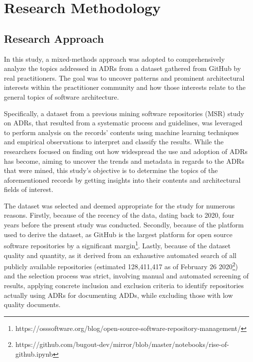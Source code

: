 \chapter{Research Methodology}
    \section{Research Approach}
        In this study, a mixed-methods approach was adopted to comprehensively analyze the topics addressed in ADRs from a dataset gathered from GitHub by real practitioners. The goal was to uncover patterns and prominent architectural interests within the practitioner community and how those interests relate to the general topics of software architecture. 

        Specifically, a dataset from a previous mining software repositories (MSR) study on ADRs, that resulted from a systematic process and guidelines, \cite{Github_study_ADRs, MSR_systematic_process} was leveraged to perform analysis on the records' contents using machine learning techniques and empirical observations to interpret and classify the results. While the researchers focused on finding out how widespread the use and adoption of ADRs has become, aiming to uncover the trends and metadata in regards to the ADRs that were mined, this study's objective is to determine the topics of the aforementioned records by getting insights into their contents and architectural fields of interest.

        The dataset was selected and deemed appropriate for the study for numerous reasons. Firstly, because of the recency of the data, dating back to 2020, four years before the present study was conducted. Secondly, because of the platform used to derive the dataset, as GitHub is the largest platform for open source software repositories by a significant margin\footnote{https://osssoftware.org/blog/open-source-software-repository-management/}. Lastly, because of the dataset quality and quantity, as it derived from an exhaustive automated search of all publicly available repositories  (estimated 128,411,417 as of February 26 2020\footnote{https://github.com/bugout-dev/mirror/blob/master/notebooks/rise-of-github.ipynb}) and the selection process was strict, involving manual and automated screening of results, applying concrete inclusion and exclusion criteria to identify repositories actually using ADRs for documenting ADDs, while excluding those with low quality documents.


